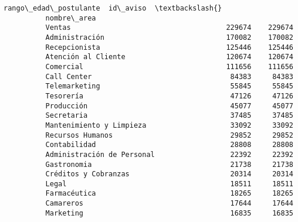 \documentclass[11pt]{article}
\begin{document}
\begin{Verbatim}[commandchars=\\\{\}]
                                      rango\_edad\_postulante  id\_aviso  \textbackslash{}
          nombre\_area                                                   
          Ventas                                     229674    229674   
          Administración                             170082    170082   
          Recepcionista                              125446    125446   
          Atención al Cliente                        120674    120674   
          Comercial                                  111656    111656   
          Call Center                                 84383     84383   
          Telemarketing                               55845     55845   
          Tesorería                                   47126     47126   
          Producción                                  45077     45077   
          Secretaria                                  37485     37485   
          Mantenimiento y Limpieza                    33092     33092   
          Recursos Humanos                            29852     29852   
          Contabilidad                                28808     28808   
          Administración de Personal                  22392     22392   
          Gastronomia                                 21738     21738   
          Créditos y Cobranzas                        20314     20314   
          Legal                                       18511     18511   
          Farmacéutica                                18265     18265   
          Camareros                                   17644     17644   
          Marketing                                   16835     16835   
          

\end{Verbatim}
\end{document}
